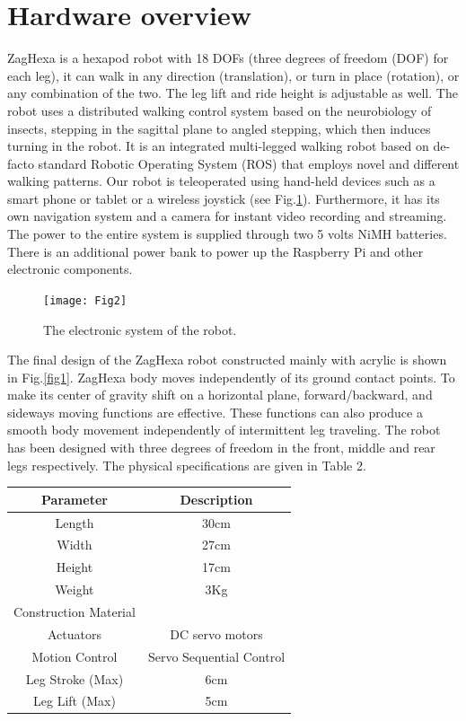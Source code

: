 \section{Hardware overview}
ZagHexa is a hexapod robot with 18 DOFs (three degrees of freedom (DOF) for each leg), it can walk in any direction (translation), or turn in place (rotation), or any combination of the two. The leg lift and ride height is adjustable as well. The robot uses a distributed walking control system based on the neurobiology of insects, stepping in the sagittal plane to angled stepping, which then induces turning in the robot.
It is an integrated multi-legged walking robot based on de-facto standard Robotic Operating System (ROS) that employs novel and different walking patterns.
Our robot is teleoperated using hand-held devices such as a smart phone or tablet or a wireless joystick (see Fig.\ref{fig4}). Furthermore, it has its own navigation system and a camera for instant video recording and streaming.
The power to the entire system is supplied through two 5 volts NiMH batteries. There is an additional power bank to power up the Raspberry Pi and other electronic components. 

\begin{figure}[H]
	\centering
	\texttt{[image: Fig2]}
	\caption{ The electronic system of the robot.}
	\label{fig4}
\end{figure}

The final design of the ZagHexa robot constructed mainly with acrylic is shown in Fig.\ref{fig1}. ZagHexa body moves independently of its ground contact points. To make its center of gravity shift on a horizontal plane, forward/backward, and sideways moving functions are effective. These functions can also produce a smooth body movement independently of intermittent leg traveling. The robot has been designed with three degrees of freedom in the front, middle and rear legs respectively. The physical specifications are given in Table 2.
\begin{center}
\begin{tabular}{|c|c|}
    \hline
    Parameter       &       Description        \\ \hline
    Length         &           30cm           \\ \hline
    Width         &           27cm           \\ \hline
    Height         &           17cm           \\ \hline
    Weight         &           3Kg            \\ \hline
    Construction Material &                          \\ \hline
    Actuators       &     DC servo motors      \\ \hline
    Motion Control     & Servo Sequential Control \\ \hline
    Leg Stroke (Max)    &           6cm            \\ \hline
    Leg Lift (Max)     &           5cm            \\ \hline
\end{tabular}
\end{center}
\noindent
